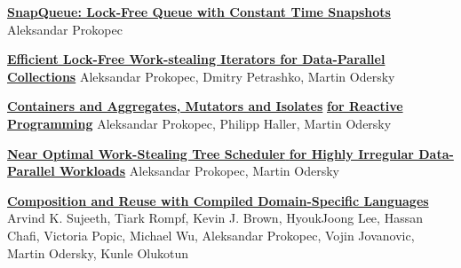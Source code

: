 \documentclass[9pt]{article}
\begin{document}
\noindent\href{http://axel22.github.io/resources/docs/snapqueue.pdf}
{\bf SnapQueue: Lock-Free Queue with Constant Time Snapshots}
\newline
\noindent Aleksandar Prokopec
\newline
{}
\bigskip

\noindent\href{http://axel22.github.io/resources/docs/pdp.pdf}
{\bf Efficient Lock-Free Work-stealing Iterators for Data-Parallel Collections}
\newline
\noindent Aleksandar Prokopec, Dmitry Petrashko, Martin Odersky
\newline
{}
\bigskip

\noindent\href{http://axel22.github.io/resources/docs/reactives-and-isolates.pdf}
{\bf Containers and Aggregates, Mutators and Isolates}
\newline
\noindent\href{http://axel22.github.io/resources/docs/reactives-and-isolates.pdf}
{\bf for Reactive Programming}
\newline
\noindent Aleksandar Prokopec, Philipp Haller, Martin Odersky
\newline
{}
\bigskip

\noindent\href{http://axel22.github.io/resources/docs/lcpc2013_submission_6.pdf}
{\bf Near Optimal Work-Stealing Tree Scheduler }
\newline
\noindent\href{http://axel22.github.io/resources/docs/lcpc2013_submission_6.pdf}
{\bf for Highly Irregular Data-Parallel Workloads}
\newline
\noindent Aleksandar Prokopec, Martin Odersky
\newline
{}
\bigskip

\noindent\href{http://axel22.github.io/resources/docs/ecoop13_sujeeth.pdf}
{\bf Composition and Reuse with Compiled Domain-Specific Languages}
\newline
\noindent Arvind K. Sujeeth, Tiark Rompf, Kevin J. Brown,
\newline
\noindent HyoukJoong Lee,
          Hassan Chafi, Victoria Popic, Michael Wu,
\newline
\noindent Aleksandar Prokopec,
          Vojin Jovanovic, Martin Odersky, Kunle Olukotun
\newline
{}
\bigskip
\end{document}
